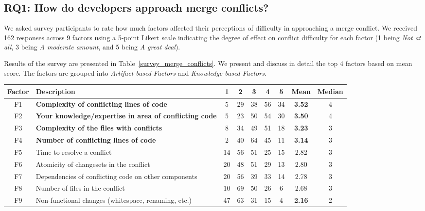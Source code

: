 \subsection{\textbf{RQ1:} How do developers approach merge conflicts?}\label{RQ1}

We asked survey participants to rate how much factors affected their perceptions of difficulty in approaching a merge conflict.
We received 162 responses across 9 factors using a 5-point Likert scale indicating the degree of effect on conflict difficulty  for each factor (1 being \textit{Not at all}, 3 being \textit{A moderate amount}, and 5 being \textit{A great deal}).

Results of the survey are presented in Table~\ref{survey_merge_conflicts}.
We present and discuss in detail the top 4 factors based on mean score.
The factors are grouped into \textit{Artifact-based Factors} and \textit{Knowledge-based Factors}.

\begin{table*}[!]
\renewcommand{\arraystretch}{1.3}
\caption{Factors of Merge Conflict Difficulty from Survey}
\label{survey_merge_conflicts}
\centering
\begin{tabularx}{0.78\textwidth}{c | l | *5{c} | *2{c}}

\toprule
	Factor & Description & 1 & 2 & 3 & 4 & 5 & Mean & Median \\
\midrule
	F1 & \textbf{Complexity of conflicting lines of code} & 5 & 29 & 38 & 56 & 34 & \textbf{3.52} & 4 \\
	F2 & \textbf{Your knowledge/expertise in area of conflicting code} & 5 & 23 & 50 & 54 & 30 & \textbf{3.50} & 4 \\
	F3 & \textbf{Complexity of the files with conflicts} & 8 & 34 & 49 & 51 & 18 & \textbf{3.23} & 3 \\
	F4 & \textbf{Number of conflicting lines of code} & 2 & 40 & 64 & 45 & 11 & \textbf{3.14} & 3 \\
	F5 & Time to resolve a conflict & 14 & 56 & 51 & 25 & 15 & 2.82 & 3 \\
	F6 & Atomicity of changesets in the conflict & 20 & 48 & 51 & 29 & 13 & 2.80 & 3 \\
	F7 & Dependencies of conflicting code on other components & 20 & 56 & 39 & 33 & 14 & 2.78 & 3 \\
	F8 & Number of files in the conflict & 10 & 69 & 50 & 26 & 6 & 2.68 & 3 \\
	F9 & Non-functional changes (whitespace, renaming, etc.) & 47 & 63 & 31 & 15 & 4 & \textbf{2.16} & 2 \\
\bottomrule
\end{tabularx}
\end{table*}

